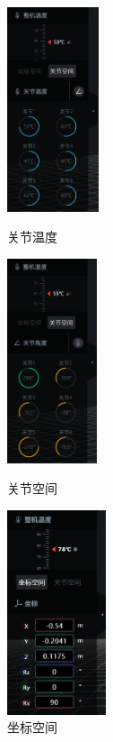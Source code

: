 \begin{figure}[ht]
	\centering
	\begin{minipage}[t]{0.32\linewidth}
		\centering
		\includegraphics[height=6cm]{screen/2-11-t.jpg}
		\caption{关节温度}
		\label{fig:温度信息}
	\end{minipage}
	\begin{minipage}[t]{0.32\linewidth}
		\centering
		\includegraphics[height=6cm]{screen/2-12-1.png}
		\caption{关节空间}
		\label{fig:关节位置信息}
	\end{minipage}
	\begin{minipage}[t]{0.32\linewidth}
		\centering
		\includegraphics[height=6cm]{screen/2-12.png}
		\caption{坐标空间}
		\label{fig:坐标位置信息}
	\end{minipage}
\end{figure}

